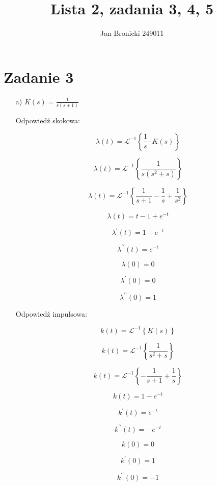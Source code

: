 \documentclass{article}
\begin{document}
\title{Lista 2, zadania 3, 4, 5}
\author{Jan Bronicki 249011}
\date{}
\maketitle

\section*{Zadanie 3}
\begin{enumerate}

    \item[a)] $K(s)=\frac{1}{s(s + 1)}$

    Odpowiedź skokowa:
    
    $$ \lambda(t)=\mathcal{L}^{-1}\left\{\frac{1}{s}\cdot K(s)\right\} $$
    
    $$ \lambda(t)=\mathcal{L}^{-1}\left\{  \frac{1}{s \left(s^{2} + s\right)} \right\}$$
    
    $$ \lambda(t)=\mathcal{L}^{-1}\left\{  \frac{1}{s + 1} - \frac{1}{s} + \frac{1}{s^{2}} \right\}$$
    
    $$ \lambda(t) = t - 1 + e^{- t} $$
    
    $$ \lambda^{\prime}(t) = 1 - e^{- t} $$
    
    $$ \lambda^{\prime\prime}(t) = e^{- t} $$
    
    $$ \lambda(0) =  0$$
    
    $$ \lambda^{\prime}(0) = 0$$
    
    $$ \lambda^{\prime\prime}(0) = 1 $$
    
    \newpage
    
    Odpowiedź impulsowa:
    
    $$ k(t)=\mathcal{L}^{-1}\left\{K(s)\right\} $$
    
    $$ k(t)=\mathcal{L}^{-1}\left\{ \frac{1}{s^{2} + s} \right\} $$
    
    $$ k(t)=\mathcal{L}^{-1}\left\{  - \frac{1}{s + 1} + \frac{1}{s}  \right\} $$
    
    $$ k(t) =  1 - e^{- t} $$
    
    $$ k^{\prime}(t) = e^{- t} $$
    
    $$ k^{\prime\prime}(t) = - e^{- t} $$
    
    $$ k(0) =  0 $$
    
    $$ k^{\prime}(0) = 1 $$
    
    $$ k^{\prime\prime}(0) = - 1 $$


    \newpage


\end{enumerate}
\end{document}
